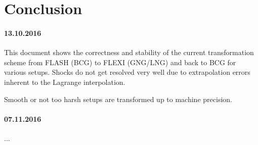 \section{Conclusion}

\paragraph{13.10.2016}
This document shows the correctness and stability of the current transformation
scheme from FLASH (BCG) to FLEXI (GNG/LNG) and back to BCG for various setups.
Shocks do not get resolved very well due to extrapolation errors inherent to
the Lagrange interpolation.

Smooth or not too harsh setups are transformed up to machine precision.

\paragraph{07.11.2016} ...
